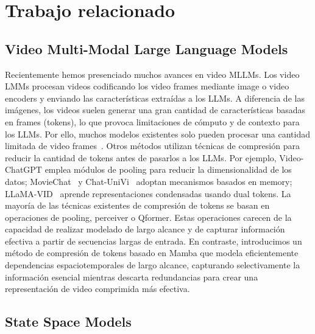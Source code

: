\section{Trabajo relacionado}
\label{sec:formatting}

\subsection{Video Multi-Modal Large Language Models}

Recientemente hemos presenciado muchos avances en video MLLMs. Los video LMMs procesan videos codificando los video frames mediante image o video encoders y enviando las características extraídas a los LLMs.
A diferencia de las imágenes, los videos suelen generar una gran cantidad de características basadas en frames (tokens), lo que provoca limitaciones de cómputo y de contexto para los LLMs. Por ello, muchos modelos existentes solo pueden procesar una cantidad limitada de video frames~\cite{li2023videochat,ataallah2024minigpt4,cheng2024videollama,zhang2024llavanextvideo,li2024llava}. Otros métodos utilizan técnicas de compresión para reducir la cantidad de tokens antes de pasarlos a los LLMs. Por ejemplo, Video-ChatGPT emplea módulos de pooling para reducir la dimensionalidad de los datos; MovieChat~\cite{Song2023MovieChatFD} y Chat-UniVi~\cite{Jin2023ChatUniViUV} adoptan mecanismos basados en memory; LLaMA-VID~\cite{Li2023LLaMAVIDAI} aprende representaciones condensadas usando dual tokens. La mayoría de las técnicas existentes de compresión de tokens se basan en operaciones de pooling, perceiver o Qformer. Estas operaciones carecen de la capacidad de realizar modelado de largo alcance y de capturar información efectiva a partir de secuencias largas de entrada. En contraste, introducimos un método de compresión de tokens basado en Mamba que modela eficientemente dependencias espaciotemporales de largo alcance, capturando selectivamente la información esencial mientras descarta redundancias para crear una representación de video comprimida más efectiva.


\subsection{State Space Models}

